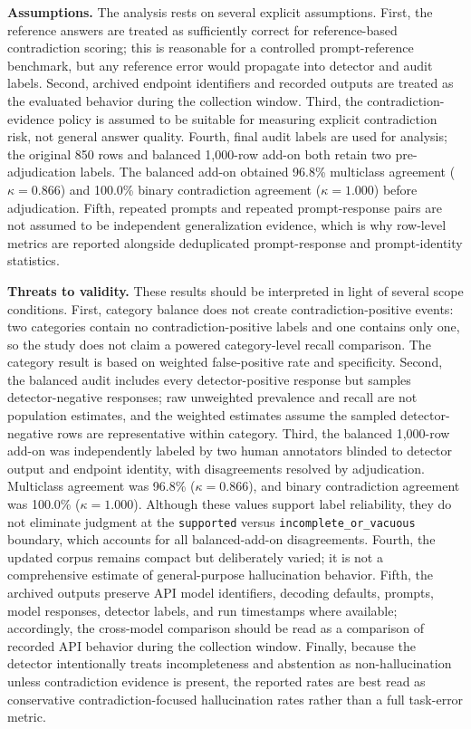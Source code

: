 \documentclass[11pt]{article}
\newcommand{\code}[1]{\texttt{#1}}
\begin{document}
\textbf{Assumptions.} The analysis rests on several explicit assumptions. First, the reference answers are treated as sufficiently correct for reference-based contradiction scoring; this is reasonable for a controlled prompt-reference benchmark, but any reference error would propagate into detector and audit labels. Second, archived endpoint identifiers and recorded outputs are treated as the evaluated behavior during the collection window. Third, the contradiction-evidence policy is assumed to be suitable for measuring explicit contradiction risk, not general answer quality. Fourth, final audit labels are used for analysis; the original 850 rows and balanced 1,000-row add-on both retain two pre-adjudication labels. The balanced add-on obtained 96.8\% multiclass agreement ($\kappa=0.866$) and 100.0\% binary contradiction agreement ($\kappa=1.000$) before adjudication. Fifth, repeated prompts and repeated prompt-response pairs are not assumed to be independent generalization evidence, which is why row-level metrics are reported alongside deduplicated prompt-response and prompt-identity statistics.


\textbf{Threats to validity.} These results should be interpreted in light of several scope conditions. First, category balance does not create contradiction-positive events: two categories contain no contradiction-positive labels and one contains only one, so the study does not claim a powered category-level recall comparison. The category result is based on weighted false-positive rate and specificity. Second, the balanced audit includes every detector-positive response but samples detector-negative responses; raw unweighted prevalence and recall are not population estimates, and the weighted estimates assume the sampled detector-negative rows are representative within category. Third, the balanced 1,000-row add-on was independently labeled by two human annotators blinded to detector output and endpoint identity, with disagreements resolved by adjudication. Multiclass agreement was 96.8\% ($\kappa=0.866$), and binary contradiction agreement was 100.0\% ($\kappa=1.000$). Although these values support label reliability, they do not eliminate judgment at the \code{supported} versus \code{incomplete\_or\_vacuous} boundary, which accounts for all balanced-add-on disagreements. Fourth, the updated corpus remains compact but deliberately varied; it is not a comprehensive estimate of general-purpose hallucination behavior. Fifth, the archived outputs preserve API model identifiers, decoding defaults, prompts, model responses, detector labels, and run timestamps where available; accordingly, the cross-model comparison should be read as a comparison of recorded API behavior during the collection window. Finally, because the detector intentionally treats incompleteness and abstention as non-hallucination unless contradiction evidence is present, the reported rates are best read as conservative contradiction-focused hallucination rates rather than a full task-error metric.
\end{document}
